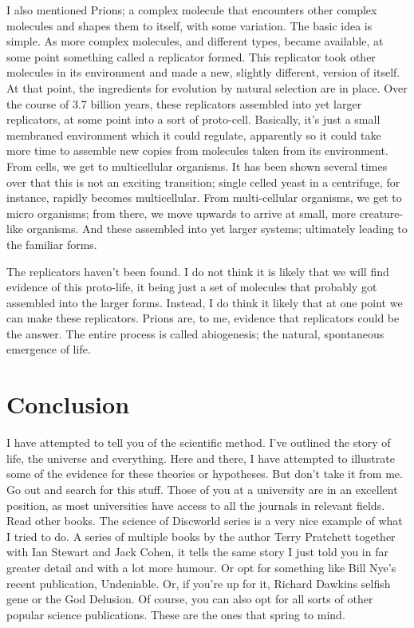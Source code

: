 \begin{multicols}{2}
I also mentioned Prions; a complex molecule that encounters other complex molecules and shapes them to itself, with some variation. The basic idea is simple. As more complex molecules, and different types, became available, at some point something called a replicator formed. This replicator took other molecules in its environment and made a new, slightly different, version of itself. At that point, the ingredients for evolution by natural selection are in place. Over the course of 3.7 billion years, these replicators assembled into yet larger replicators, at some point into a sort of proto-cell. Basically, it's just a small membraned environment which it could regulate, apparently so it could take more time to assemble new copies from molecules taken from its environment. From cells, we get to multicellular organisms. It has been shown several times over that this is not an exciting transition; single celled yeast in a centrifuge, for instance, rapidly becomes multicellular. From multi-cellular organisms, we get to micro organisms; from there, we move upwards to arrive at small, more creature-like organisms. And these assembled into yet larger systems; ultimately leading to the familiar forms.

The replicators haven't been found. I do not think it is likely that we will find evidence of this proto-life, it being just a set of molecules that probably got assembled into the larger forms. Instead, I do think it likely that at one point we can make these replicators. Prions are, to me, evidence that replicators could be the answer. The entire process is called abiogenesis; the natural, spontaneous emergence of life.

\section{Conclusion}
I have attempted to tell you of the scientific method. I've outlined the story of life, the universe and everything. Here and there, I have attempted to illustrate some of the evidence for these theories or hypotheses. But don't take it from me. Go out and search for this stuff. Those of you at a university are in an excellent position, as most universities have access to all the journals in relevant fields. Read other books. The science of Discworld series is a very nice example of what I tried to do. A series of multiple books by the author Terry Pratchett together with Ian Stewart and Jack Cohen, it tells the same story I just told you in far greater detail and with a lot more humour. Or opt for something like Bill Nye's recent publication, Undeniable. Or, if you're up for it, Richard Dawkins selfish gene or the God Delusion. Of course, you can also opt for all sorts of other popular science publications. These are the ones that spring to mind.
\end{multicols}